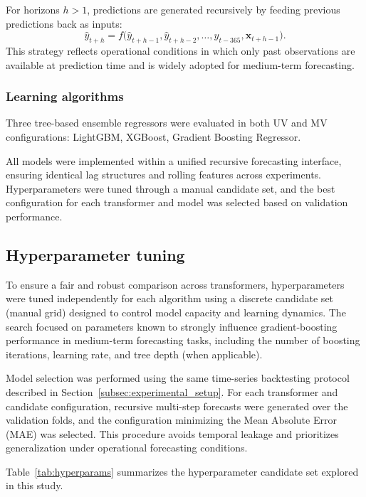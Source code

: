 For horizons $h>1$, predictions are generated recursively by feeding previous predictions back as inputs:
\begin{equation}
\hat{y}_{t+h} = f\big( \hat{y}_{t+h-1}, \hat{y}_{t+h-2}, \dots, y_{t-365}, \mathbf{x}_{t+h-1} \big).
\end{equation}
This strategy reflects operational conditions in which only past observations are available at prediction time and is widely adopted for medium-term forecasting.

\subsubsection{Learning algorithms}
Three tree-based ensemble regressors were evaluated in both UV and MV configurations: LightGBM, XGBoost, Gradient Boosting Regressor.

All models were implemented within a unified recursive forecasting interface, ensuring identical lag structures and rolling features across experiments. Hyperparameters were tuned through a manual candidate set, and the best configuration for each transformer and model was selected based on validation performance.
\subsection{Hyperparameter tuning}
\label{subsec:hyperparameter_tuning}

To ensure a fair and robust comparison across transformers, hyperparameters were tuned independently for each algorithm using a discrete candidate set (manual grid) designed to control model capacity and learning dynamics. The search focused on parameters known to strongly influence gradient-boosting performance in medium-term forecasting tasks, including the number of boosting iterations, learning rate, and tree depth (when applicable). 

Model selection was performed using the same time-series backtesting protocol described in Section~\ref{subsec:experimental_setup}. For each transformer and candidate configuration, recursive multi-step forecasts were generated over the validation folds, and the configuration minimizing the Mean Absolute Error (MAE) was selected. This procedure avoids temporal leakage and prioritizes generalization under operational forecasting conditions.

Table~\ref{tab:hyperparams} summarizes the hyperparameter candidate set explored in this study.

